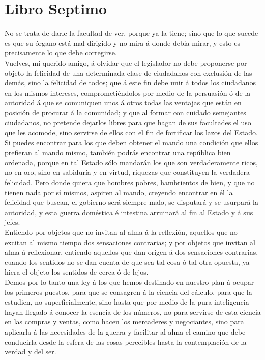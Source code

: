 \documentclass[10pt]{book}
\begin{document}
\chapter*{Libro Septimo}
 No se trata de darle la facultad de ver, porque ya la tiene; sino que lo que sucede es que su órgano está mal dirigido y no mira á donde debia mirar, y esto es precisamente lo que debe corregirse.\\
 Vuelves, mi querido amigo, á olvidar que el legislador no debe proponerse por objeto la felicidad de una determinada clase de ciudadanos con exclusión de las demás, sino la felicidad de todos; que á este fin debe unir á todos los ciudadanos en los mismos intereses, comprometiéndolos por medio de la persuasión ó de la autoridad á que se comuniquen unos á otros todas las ventajas que están en posición de procurar á la comunidad; y que al formar con cuidado semejantes ciudadanos, no pretende dejarlos libres para que hagan de sus facultades el uso que les acomode, sino servirse de ellos con el fin de fortificar los lazos del Estado. \\
Si puedes encontrar para los que deben obtener el mando una condición que ellos prefieran al mando mismo, también podrás encontrar una república bien ordenada, porque en tal Estado sólo mandarán los que son verdaderamente ricos, no en oro, sino en sabiduría y en virtud, riquezas que constituyen la verdadera felicidad. Pero donde quiera que hombres pobres, hambrientos de bien, y que no tienen nada por sí mismos, aspiren al mando, creyendo encontrar en él la felicidad que buscan, el gobierno será siempre malo, se disputará y se usurpará la autoridad, y esta guerra doméstica é intestina arruinará al fin al Estado y á sus jefes. \\
Entiendo por objetos que no invitan al alma á la reflexión, aquellos que no excitan al mismo tiempo dos sensaciones contrarias; y por objetos que invitan al alma á reflexionar, entiendo aquellos que dan origen á dos sensaciones contrarias, cuando los sentidos no se dan cuenta de que sea tal cosa ó tal otra opuesta, ya hiera el objeto los sentidos de cerca ó de lejos.\\
Demos por lo tanto una ley á los que hemos destinado en nuestro plan á ocupar los primeros puestos, para
que se consagren á la ciencia del cálculo, para que la estudien, no superficialmente, sino hasta que por medio de la pura inteligencia hayan llegado á conocer la esencia de los números, no para servirse de esta ciencia en las compras y ventas, como hacen los mercaderes y negociantes, sino para aplicarla á las necesidades de la guerra y facilitar al alma el camino que debe conducirla desde la esfera de las cosas perecibles hasta la contemplación de la verdad y del ser. \\
\end{document}
